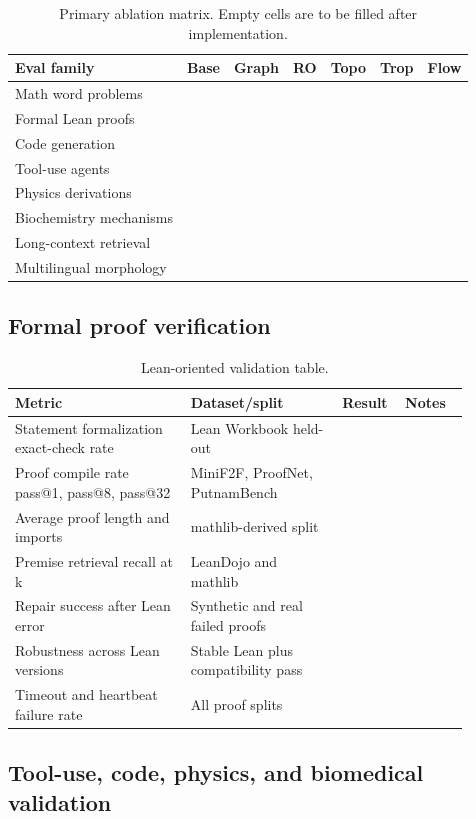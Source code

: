 \documentclass[11pt]{article}
\newcommand{\1}{\mathbf{1}}
\begin{document}
\begin{table}[H]
\centering
\scriptsize
\caption{Primary ablation matrix. Empty cells are to be filled after implementation.}
\label{tab:ablation-empty}
\begin{tabular}{@{}lcccccc@{}}
\toprule
Eval family & Base & Graph & RO & Topo & Trop & Flow\\
\midrule
Math word problems & & & & & & \\
Formal Lean proofs & & & & & & \\
Code generation & & & & & & \\
Tool-use agents & & & & & & \\
Physics derivations & & & & & & \\
Biochemistry mechanisms & & & & & & \\
Long-context retrieval & & & & & & \\
Multilingual morphology & & & & & & \\
\bottomrule
\end{tabular}
\end{table}

\subsection{Formal proof verification}

\begin{longtable}{@{}p{0.36\linewidth}p{0.31\linewidth}p{0.10\linewidth}p{0.13\linewidth}@{}}
\caption{Lean-oriented validation table.}\label{tab:lean-empty}\\
\toprule
Metric & Dataset/split & Result & Notes\\
\midrule
Statement formalization exact-check rate & Lean Workbook held-out & & \\
Proof compile rate pass@1, pass@8, pass@32 & MiniF2F, ProofNet, PutnamBench & & \\
Average proof length and imports & mathlib-derived split & & \\
Premise retrieval recall at k & LeanDojo and mathlib & & \\
Repair success after Lean error & Synthetic and real failed proofs & & \\
Robustness across Lean versions & Stable Lean plus compatibility pass & & \\
Timeout and heartbeat failure rate & All proof splits & & \\
\bottomrule
\end{longtable}

\subsection{Tool-use, code, physics, and biomedical validation}
\end{document}
